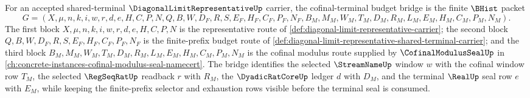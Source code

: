 \begin{definition}
\label{def:diagonal-limit-representative-cofinal-terminal-budget-bridge}
For an accepted shared-terminal $\DiagonalLimitRepresentativeUp$ carrier, the cofinal-terminal budget bridge is the finite $\BHist$ packet
$$
G=(X,\mu,n,k,i,w,r,d,e,H,C,P,N,Q,B,W,D_F,R,S,E_F,H_F,C_F,P_F,N_F,B_M,M_M,W_M,T_M,D_M,R_M,L_M,E_M,H_M,C_M,P_M,N_M).
$$
The first block $X,\mu,n,k,i,w,r,d,e,H,C,P,N$ is the representative route of \autoref{def:diagonal-limit-representative-carrier}; the second block $Q,B,W,D_F,R,S,E_F,H_F,C_F,P_F,N_F$ is the finite-prefix budget route of \autoref{def:diagonal-limit-representative-shared-terminal-carrier}; and the third block $B_M,M_M,W_M,T_M,D_M,R_M,L_M,E_M,H_M,C_M,P_M,N_M$ is the cofinal modulus route supplied by $\CofinalModulusSealUp$ in \autoref{ch:concrete-instances-cofinal-modulus-seal-namecert}. The bridge identifies the selected $\StreamNameUp$ window $w$ with the cofinal window row $T_M$, the selected $\RegSeqRatUp$ readback $r$ with $R_M$, the $\DyadicRatCoreUp$ ledger $d$ with $D_M$, and the terminal $\RealUp$ seal row $e$ with $E_M$, while keeping the finite-prefix selector and exhaustion rows visible before the terminal seal is consumed.
\end{definition}

